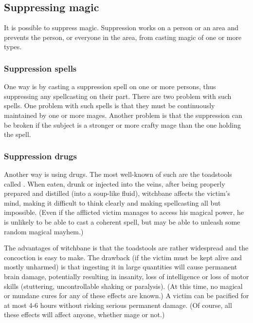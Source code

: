 \subsection{Suppressing magic}
It is possible to suppress magic. Suppression works on a person or an area and prevents the person, or everyone in the area, from casting magic of one or more types. 





\subsubsection{Suppression spells}
One way is by casting a suppression spell on one or more persons, thus suppressing any spellcasting on their part. There are two problem with such spells. One problem with such spells is that they must be continuously maintained by one or more mages. Another problem is that the suppression can be broken if the subject is a stronger or more crafty mage than the one holding the spell. 





\subsubsection{Suppression drugs}
Another way is using drugs. The most well-known of such are the toadstools called . When eaten, drunk or injected into the veins, after being properly prepared and distilled (into a soup-like fluid), witchbane affects the victim's mind, making it difficult to think clearly and making spellcasting all but impossible. (Even if the afflicted victim manages to access his magical power, he is unlikely to be able to cast a coherent spell, but may be able to unleash some random magical mayhem.) 

The advantages of witchbane is that the toadstools are rather widespread and the concoction is easy to make. The drawback (if the victim must be kept alive and mostly unharmed) is that ingesting it in large quantities will cause permanent brain damage, potentially resulting in insanity, loss of intelligence or loss of motor skills (stuttering, uncontrollable shaking or paralysis). (At this time, no magical or mundane cures for any of these effects are known.) A victim can be pacified for at most 4-6 hours without risking serious permanent damage. (Of course, all these effects will affect anyone, whether mage or not.)

